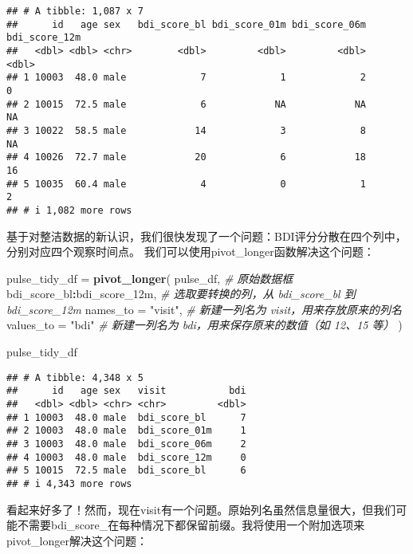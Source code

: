 \documentclass[
]{article}
\newenvironment{Shaded}{\begin{snugshade}}{\end{snugshade}}
\newcommand{\AttributeTok}[1]{\textcolor[rgb]{0.13,0.29,0.53}{#1}}
\newcommand{\CommentTok}[1]{\textcolor[rgb]{0.56,0.35,0.01}{\textit{#1}}}
\newcommand{\FunctionTok}[1]{\textcolor[rgb]{0.13,0.29,0.53}{\textbf{#1}}}
\newcommand{\NormalTok}[1]{#1}
\newcommand{\OtherTok}[1]{\textcolor[rgb]{0.56,0.35,0.01}{#1}}
\newcommand{\SpecialCharTok}[1]{\textcolor[rgb]{0.81,0.36,0.00}{\textbf{#1}}}
\newcommand{\StringTok}[1]{\textcolor[rgb]{0.31,0.60,0.02}{#1}}
\begin{document}
\begin{verbatim}
## # A tibble: 1,087 x 7
##      id   age sex   bdi_score_bl bdi_score_01m bdi_score_06m bdi_score_12m
##   <dbl> <dbl> <chr>        <dbl>         <dbl>         <dbl>         <dbl>
## 1 10003  48.0 male             7             1             2             0
## 2 10015  72.5 male             6            NA            NA            NA
## 3 10022  58.5 male            14             3             8            NA
## 4 10026  72.7 male            20             6            18            16
## 5 10035  60.4 male             4             0             1             2
## # i 1,082 more rows
\end{verbatim}

基于对整洁数据的新认识，我们很快发现了一个问题：BDI评分分散在四个列中，分别对应四个观察时间点。
我们可以使用pivot\_longer函数解决这个问题：

\begin{Shaded}
\begin{Highlighting}[]
\NormalTok{pulse\_tidy\_df }\OtherTok{=} 
  \FunctionTok{pivot\_longer}\NormalTok{(}
\NormalTok{    pulse\_df,                            }\CommentTok{\# 原始数据框}
\NormalTok{    bdi\_score\_bl}\SpecialCharTok{:}\NormalTok{bdi\_score\_12m,         }\CommentTok{\# 选取要转换的列，从 bdi\_score\_bl 到 bdi\_score\_12m}
    \AttributeTok{names\_to =} \StringTok{"visit"}\NormalTok{,                 }\CommentTok{\# 新建一列名为 visit，用来存放原来的列名}
    \AttributeTok{values\_to =} \StringTok{"bdi"}                   \CommentTok{\# 新建一列名为 bdi，用来保存原来的数值（如 12、15 等）}
\NormalTok{  )}

\NormalTok{pulse\_tidy\_df}
\end{Highlighting}
\end{Shaded}

\begin{verbatim}
## # A tibble: 4,348 x 5
##      id   age sex   visit           bdi
##   <dbl> <dbl> <chr> <chr>         <dbl>
## 1 10003  48.0 male  bdi_score_bl      7
## 2 10003  48.0 male  bdi_score_01m     1
## 3 10003  48.0 male  bdi_score_06m     2
## 4 10003  48.0 male  bdi_score_12m     0
## 5 10015  72.5 male  bdi_score_bl      6
## # i 4,343 more rows
\end{verbatim}

看起来好多了！然而，现在visit有一个问题。原始列名虽然信息量很大，但我们可能不需要bdi\_score\_在每种情况下都保留前缀。我将使用一个附加选项来pivot\_longer解决这个问题：
\end{document}
